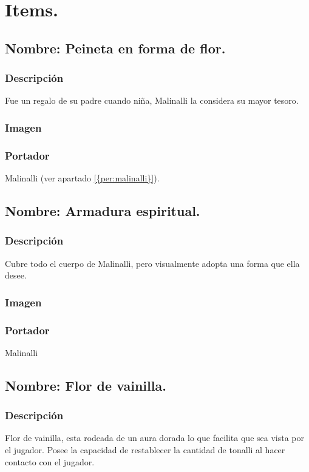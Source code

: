 \chapter{Items.}
	\section{Nombre: Peineta en forma de flor.}\label{item:peineta}
	\subsection{Descripción}
	Fue un regalo de su padre cuando niña, Malinalli la considera su mayor tesoro.
	\subsection{Imagen}
	\subsection{Portador}
	Malinalli (ver apartado \ref{{per:malinalli}}).

	\section{Nombre: Armadura espiritual.}\label{item:armadura}
	\subsection{Descripción}
	Cubre todo el cuerpo de Malinalli, pero visualmente adopta una forma que ella desee.
	\subsection{Imagen}
	\subsection{Portador}
	Malinalli 
	
	\section{Nombre: Flor de vainilla.}\label{item:vainilla}
	\subsection{Descripción}
	Flor de vainilla, esta rodeada de un aura dorada lo que facilita que sea vista por el jugador. Posee la capacidad de restablecer la cantidad de tonalli al hacer contacto con el jugador.
